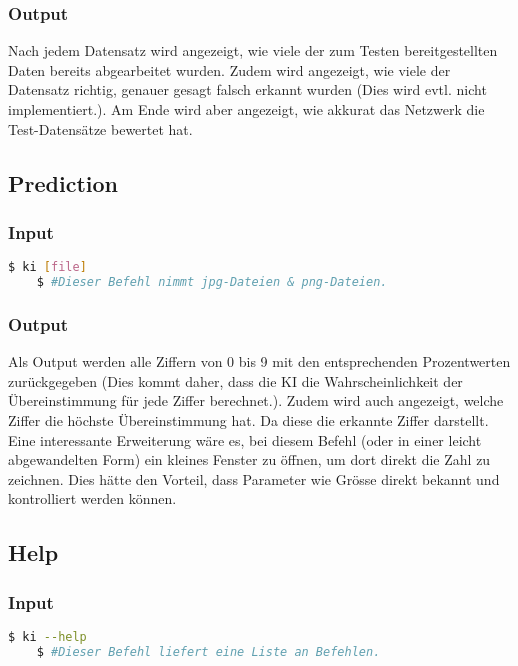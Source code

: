 \subsubsection{Output}
\label{sec:TestOutput}
Nach jedem Datensatz wird angezeigt, wie viele der zum Testen bereitgestellten Daten bereits abgearbeitet wurden. Zudem wird angezeigt, wie viele der Datensatz richtig, genauer gesagt falsch erkannt wurden (Dies wird evtl. nicht implementiert.). Am Ende wird aber angezeigt, wie akkurat das Netzwerk die Test-Datensätze bewertet hat. 

\subsection{Prediction}
\label{sec:DesignAnwendung}
\subsubsection{Input}
\label{sec:DesignUseInput}
\begin{lstlisting}[language=bash]
	$ ki [file]
	$ #Dieser Befehl nimmt jpg-Dateien & png-Dateien.
\end{lstlisting}

\subsubsection{Output}
\label{sec:DesignUseOutput}
Als Output werden alle Ziffern von 0 bis 9 mit den entsprechenden Prozentwerten zurückgegeben (Dies kommt daher, dass die KI die Wahrscheinlichkeit der Übereinstimmung für jede Ziffer berechnet.). Zudem wird auch angezeigt, welche Ziffer die höchste Übereinstimmung hat. Da diese die erkannte Ziffer darstellt.
\\
Eine interessante Erweiterung wäre es, bei diesem Befehl (oder in einer leicht abgewandelten Form) ein kleines Fenster zu öffnen, um dort direkt die Zahl zu zeichnen. Dies hätte den Vorteil, dass Parameter wie Grösse direkt bekannt und kontrolliert werden können.

\subsection{Help}
\label{sec:DesignHelp}
\subsubsection{Input}
\label{sec:DesignHelpInput}
\begin{lstlisting}[language=bash]
	$ ki --help
	$ #Dieser Befehl liefert eine Liste an Befehlen.
\end{lstlisting}

